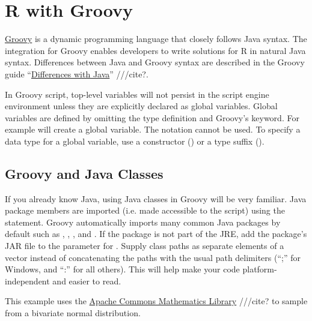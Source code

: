 \section{R with Groovy}

\href{http://www.groovy-lang.org/}{Groovy} is a dynamic programming language that closely follows Java syntax. The  integration for Groovy enables developers to write solutions for R in natural Java syntax. Differences between Java and Groovy syntax are described in the Groovy guide “\href{http://groovy-lang.org/differences.html}{Differences with Java}” ///cite?.

 In Groovy script, top-level variables will not persist in the script engine environment unless they are explicitly declared as global variables. Global variables are defined by omitting the type definition and Groovy's  keyword. For example  will create a global variable. The  notation cannot be used. To specify a data type for a global variable, use a constructor () or a type suffix ().

\subsection{Groovy and Java Classes}


If you already know Java, using Java classes in Groovy will be very familiar. Java package members are imported (i.e. made accessible to the script) using the  statement. Groovy automatically imports many common Java packages by default such as , , , and . If the package is not part of the JRE, add the package's JAR file to the  parameter for .  Supply class paths as separate elements of a vector instead of concatenating the paths with the usual path delimiters (“;” for Windows, and “:” for all others). This will help make your code platform-independent and easier to read.

This example uses the \href{http://commons.apache.org/proper/commons-math/}{Apache Commons Mathematics Library} ///cite? to sample from a bivariate normal distribution.

